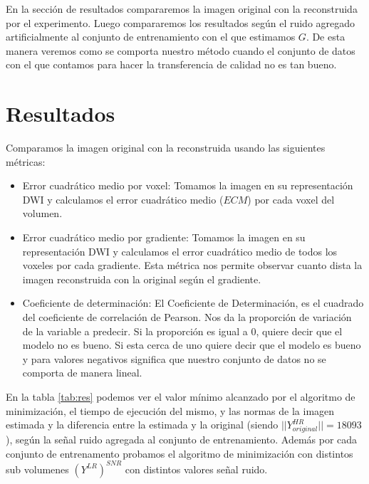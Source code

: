 \documentclass[a4paper,10pt]{article}%
\begin{document}
En la sección de resultados compararemos la imagen original con la reconstruida por el 
experimento. Luego compararemos los resultados según el ruido agregado 
artificialmente al conjunto 
de entrenamiento con el que estimamos $G$. De esta manera veremos como se comporta nuestro 
m\'etodo cuando el conjunto de datos con el que contamos para hacer la transferencia de calidad no 
es tan bueno.

\section{Resultados}

Comparamos la imagen original con la reconstruida usando las siguientes 
métricas:

\begin{itemize}
 \item Error cuadrático medio por voxel: Tomamos la imagen en su 
representación DWI y calculamos el error cuadrático medio ($ECM$) por cada voxel del 
volumen.
 \item Error cuadrático medio por gradiente: Tomamos la imagen en su 
representación DWI y calculamos el error cuadrático medio de todos los voxeles 
por cada gradiente. Esta métrica nos permite observar cuanto dista la imagen 
reconstruida con la original según el gradiente.
 \item Coeficiente de determinación: El Coeficiente de Determinación, es el cuadrado del 
coeficiente de correlación de Pearson. Nos da la proporción de variación de la variable a predecir. 
Si la proporción es igual a 0, quiere decir que el modelo no es bueno. Si esta cerca de uno 
quiere decir que el modelo es bueno y para valores negativos significa que nuestro conjunto de 
datos no se comporta de manera lineal.
\end{itemize}





En la tabla \ref{tab:res} podemos ver el valor mínimo alcanzado por el algoritmo de minimización, el 
tiempo de ejecución del mismo, y las normas de la imagen estimada y la diferencia entre la estimada 
y la original (siendo $||Y^{HR}_{original}|| = 18093$), seg\'un la se\~nal ruido agregada al 
conjunto de entrenamiento. Adem\'as por cada conjunto de entrenamento probamos el algoritmo de 
minimizaci\'on con distintos sub volumenes $(Y^{LR})^{SNR}$ con distintos valores se\~nal ruido.
\end{document}

